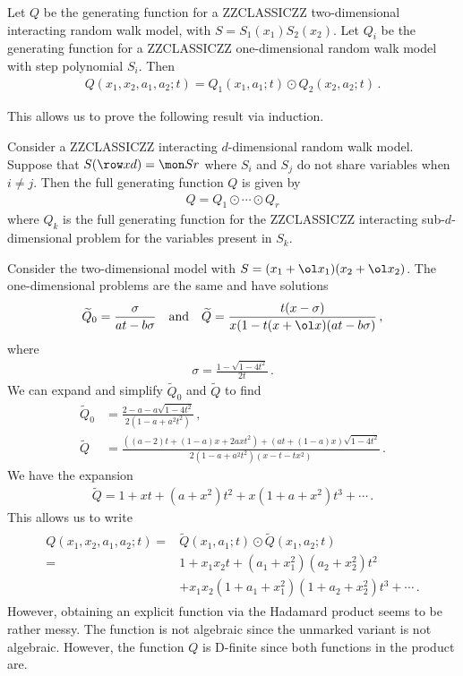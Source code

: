 \begin{lemma} Let $Q$ be the generating function for a ZZCLASSICZZ two-dimensional interacting random walk model, with $S = S_1(x_1)S_2(x_2)$. Let $Q_i$ be the generating function for a ZZCLASSICZZ one-dimensional random walk model with step polynomial $S_i$. Then
\begin{align}
	Q(x_1,x_2,a_1,a_2;t) = Q_1(x_1,a_1;t)\odot Q_2(x_2,a_2;t)\,.
\end{align}
\end{lemma}
This allows us to prove the following result via induction.
\begin{theorem} Consider a ZZCLASSICZZ interacting $d$-dimensional random walk model. Suppose that $S(\row xd) = \mon Sr$ where $S_i$ and $S_j$ do not share variables when $i\neq j$. Then the full generating function $Q$ is given by
\begin{align}
	Q = Q_1 \odot \cdots \odot Q_r
\end{align}
where $Q_k$ is the full generating function for the ZZCLASSICZZ interacting sub-$d$-dimensional problem for the variables present in $S_k$.
\end{theorem}

\begin{example} Consider the two-dimensional model with $S = (x_1+\ol x_1)(x_2+\ol x_2)$. The one-dimensional problems are the same and have solutions
\begin{align}
	\widetilde{Q}_0 = \frac{\sigma}{at-b\sigma}\quad\text{and}\quad \widetilde{Q} = \frac{t(x-\sigma)}{x(1-t(x+\ol x)(at-b\sigma)}\,,
\end{align}
where
\begin{align}
	\sigma = \frac{1-\sqrt{1-4t^2}}{2t}\,.
\end{align}
We can expand and simplify $\widetilde{Q}_0$ and $\widetilde{Q}$ to find
\begin{align}
	\widetilde{Q}_0 &= \frac{2-a-a\sqrt{1-4t^2}}{2(1-a+a^2t^2)}\,,\\
	\widetilde{Q} &= \frac{((a-2)t+(1-a)x+2axt^2)+(at+(1-a)x)\sqrt{1-4t^2}}{2(1-a+a^2t^2)(x-t-tx^2)}\,.
\end{align}
We have the expansion
\begin{align}
	\widetilde{Q} = 1 + xt + (a+x^2)t^2+x(1+a+x^2)t^3 + \cdots\,.
\end{align}
This allows us to write
\begin{align}
\begin{split}
	Q(x_1,x_2,a_1,a_2;t) =& \widetilde{Q}(x_1,a_1;t) \odot \widetilde{Q}(x_1,a_2;t)\\
		=&1 + x_1x_2t + (a_1+x_1^2)(a_2+x_2^2)t^2\\
		&+x_1x_2(1+a_1+x_1^2)(1+a_2+x_2^2)t^3 + \cdots\,.
\end{split}
\end{align}
However, obtaining an explicit function via the Hadamard product seems to be rather messy. The function is not algebraic since the unmarked variant is not algebraic. However, the function $Q$ is D-finite since both functions in the product are.
\end{example}

